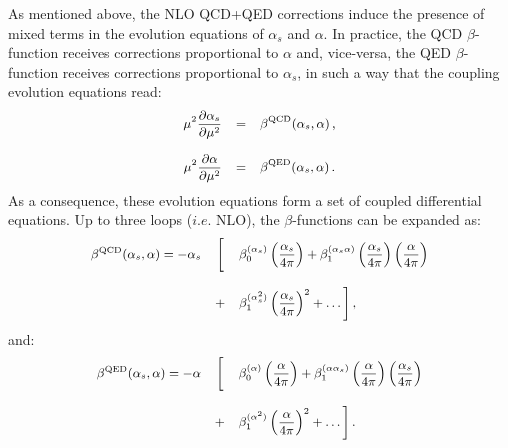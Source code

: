 As mentioned above, the NLO QCD+QED corrections induce the presence of
mixed terms in the evolution equations of $\alpha_s$ and $\alpha$. In
practice, the QCD $\beta$-function receives corrections proportional
to $\alpha$ and, vice-versa, the QED $\beta$-function receives
corrections proportional to $\alpha_s$, in such a way that the
coupling evolution equations read:
\begin{equation}\label{CoupledEq}
\small
\begin{array}{rcl}
\displaystyle \mu^2\frac{\partial \alpha_s}{\partial \mu^2} &=& \displaystyle
                                                \beta^{\rm QCD}(\alpha_s,\alpha)\,,\\
\\
\displaystyle \mu^2\frac{\partial \alpha}{\partial \mu^2} &=& \displaystyle \beta^{\rm QED}(\alpha_s,\alpha)\,.
\end{array}
\end{equation}
As a consequence, these evolution equations form a set of coupled
differential equations. Up to three loops ($i.e.$ NLO), the
$\beta$-functions can be expanded as:
\begin{equation}
\small
\begin{array}{rcl}
  \beta^{\rm QCD}(\alpha_s,\alpha) = 
                                       -\alpha_s &\bigg[&\displaystyle\beta_0^{(\alpha_s)}\left(\frac{\alpha_s}{4\pi}\right)+\beta_1^{(\alpha_s\alpha)}\left(\frac{\alpha_s}{4\pi}\right)
                                       \left(\frac{\alpha}{4\pi}\right)\\
\\
                                   &+&\displaystyle \beta_1^{(\alpha_s^2)}\left(\frac{\alpha_s}{4\pi}\right)^2+\dots\bigg]\,,
\end{array}
\end{equation}
and:
\begin{equation}
\small
\begin{array}{rcl}
\beta^{\rm QED}(\alpha_s,\alpha) = -\alpha&\bigg[&\displaystyle
                                                   \beta_0^{(\alpha)}\left(\frac{\alpha}{4\pi}\right)+\beta_1^{(\alpha\alpha_s)}\left(\frac{\alpha}{4\pi}\right)
                                                   \left(\frac{\alpha_s}{4\pi}\right)\\
\\
                                          &+&\displaystyle \beta_1^{(\alpha^2)}\left(\frac{\alpha}{4\pi}\right)^2+\dots\bigg]\,.
\end{array}
\end{equation}
